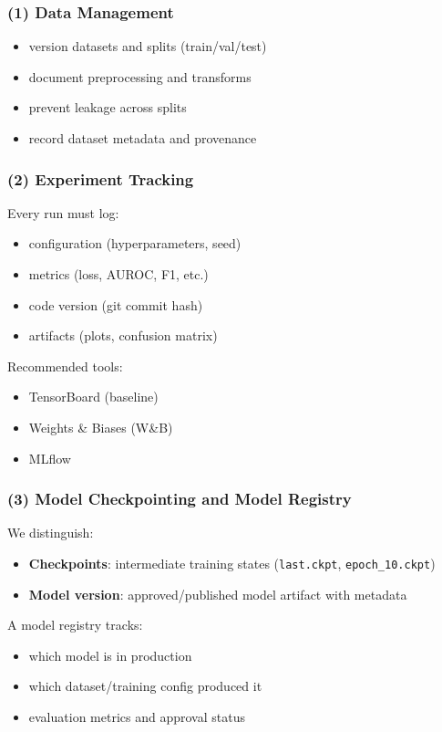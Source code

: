 \documentclass[11pt]{article}
\begin{document}
\subsubsection{(1) Data Management}
\begin{itemize}
  \item version datasets and splits (train/val/test)
  \item document preprocessing and transforms
  \item prevent leakage across splits
  \item record dataset metadata and provenance
\end{itemize}

\subsubsection{(2) Experiment Tracking}
Every run must log:
\begin{itemize}
  \item configuration (hyperparameters, seed)
  \item metrics (loss, AUROC, F1, etc.)
  \item code version (git commit hash)
  \item artifacts (plots, confusion matrix)
\end{itemize}

Recommended tools:
\begin{itemize}
  \item TensorBoard (baseline)
  \item Weights \& Biases (W\&B)
  \item MLflow
\end{itemize}

\subsubsection{(3) Model Checkpointing and Model Registry}
We distinguish:
\begin{itemize}
  \item \textbf{Checkpoints}: intermediate training states (\texttt{last.ckpt}, \texttt{epoch\_10.ckpt})
  \item \textbf{Model version}: approved/published model artifact with metadata
\end{itemize}

A model registry tracks:
\begin{itemize}
  \item which model is in production
  \item which dataset/training config produced it
  \item evaluation metrics and approval status
\end{itemize}
\end{document}
